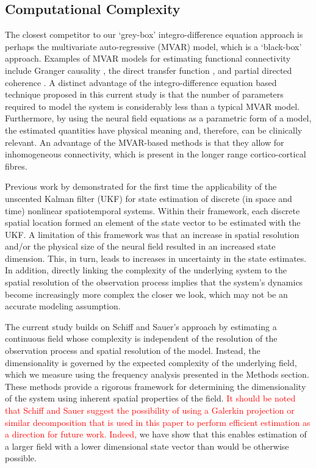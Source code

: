 \documentclass[review,authoryear,3p]{elsarticle}
\newcommand{\dean}[1]{\textcolor{red}{#1}}
\begin{document}
\subsection{Computational Complexity}
The closest competitor to our `grey-box' integro-difference equation approach is perhaps the multivariate auto-regressive (MVAR) model, which is a `black-box' approach. Examples of MVAR models for estimating functional connectivity include Granger causality \citep{Hesse2003}, the direct transfer function \citep{Kaminski1991}, and partial directed coherence \citep{Sameshima1999}. A distinct advantage of the integro-difference equation based technique proposed in this current study is that the number of parameters required to model the system is considerably less than a typical MVAR model. Furthermore, by using the neural field equations as a parametric form of a model, the estimated quantities have physical meaning and, therefore, can be clinically relevant. An advantage of the MVAR-based methods is that they allow for inhomogeneous connectivity, which is present in the longer range cortico-cortical fibres. 

Previous work by \citet{schiff2008kalman} demonstrated for the first time the applicability of the unscented Kalman filter (UKF) for state estimation of discrete (in space and time) nonlinear spatiotemporal systems. Within their framework, each discrete spatial location formed an element of the state vector to be estimated with the UKF. A limitation of this framework was that an increase in spatial resolution and/or the physical size of the neural field resulted in an increased state dimension. This, in turn, leads to increases in uncertainty in the state estimates. In addition, directly linking the complexity of the underlying system to the spatial resolution of the observation process implies that the system's dynamics become increasingly more complex the closer we look, which may not be an accurate modeling assumption.

The current study builds on Schiff and Sauer's approach by estimating a continuous field whose complexity is independent of the resolution of the observation process and spatial resolution of the model. Instead, the dimensionality is governed by the expected complexity of the underlying field, which we measure using the frequency analysis presented in the Methods section. These methods provide a rigorous framework for determining the dimensionality of the system using inherent spatial properties of the field. \dean{It should be noted that Schiff and Sauer suggest the possibility of using a Galerkin projection or similar decomposition that is used in this paper to perform efficient estimation as a direction for future work. Indeed,} we have show that this enables estimation of a larger field with a lower dimensional state vector than would be otherwise possible. 
\end{document}

